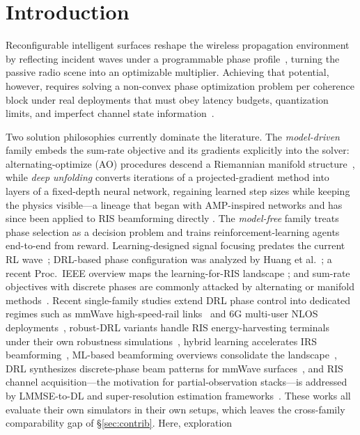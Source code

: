 \section{Introduction}
\label{sec:intro}

Reconfigurable intelligent surfaces reshape the wireless propagation
environment by reflecting incident waves under a programmable phase
profile~\cite{huang2019reconfigurable,wu2019towards}, turning the
passive radio scene into an optimizable multiplier. Achieving that
potential, however, requires solving a non-convex phase
optimization problem per coherence block under real deployments that
must obey latency budgets, quantization limits, and imperfect channel
state information~\cite{wu2020intelligent}.

Two solution philosophies currently dominate the literature. The
\emph{model-driven} family embeds the sum-rate objective and its
gradients explicitly into the solver: alternating-optimize (AO)
procedures descend a Riemannian manifold
structure~\cite{absil2008optimization,zhang2021manifold}, while
\emph{deep unfolding} \cite{shlezinger2023model} converts iterations of
a projected-gradient method into layers of a fixed-depth neural
network, regaining learned step sizes while keeping the physics
visible---a lineage that began with AMP-inspired networks
\cite{borgerding2017amp} and has since been applied to RIS
beamforming directly \cite{liu2022deepunfolding}. The \emph{model-free} family treats phase selection as a
decision problem and trains reinforcement-learning
agents~\cite{mnih2015human,lillicrap2015continuous,fujimoto2018addressing,haarnoja2018soft}
end-to-end from reward. Learning-designed signal focusing predates the
current RL wave~\cite{huang2019indoor}; DRL-based phase configuration
was analyzed by Huang et al.~\cite{huang2020risdrl}; a recent
Proc.~IEEE overview maps the learning-for-RIS landscape
\cite{alexandropoulos2022pervasive}; and sum-rate objectives with
discrete phases are commonly attacked by alternating or manifold
methods~\cite{guo2020weighted,zhang2021manifold}. Recent single-family
studies extend DRL phase control into dedicated regimes such as
mmWave high-speed-rail links~\cite{xu2022when} and 6G multi-user NLOS
deployments~\cite{aasa2026deep}, robust-DRL variants handle RIS
energy-harvesting terminals under their own robustness
simulations~\cite{peng2023energy}, hybrid learning accelerates IRS
beamforming~\cite{sivasankar2025fast}, ML-based beamforming overviews
consolidate the landscape~\cite{ahmadinejad2025beamforming}, DRL
synthesizes discrete-phase beam patterns for mmWave
surfaces~\cite{nishad2026deep}, and RIS channel acquisition---the
motivation for partial-observation stacks---is addressed by
LMMSE-to-DL and super-resolution estimation
frameworks~\cite{kundu2021channel,shen2023deep}. These works all
evaluate their own simulators in their own setups, which leaves the
cross-family comparability gap of \S\ref{sec:contrib}. Here,
exploration


